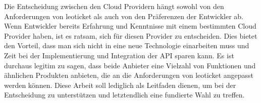 Die Entscheidung zwischen den Cloud Providern hängt sowohl von den Anforderungen von leoticket als auch von den Präferenzen der Entwickler ab. Wenn Entwickler bereits Erfahrung und Kenntnisse mit einem bestimmten Cloud Provider haben, ist es ratsam, sich für diesen Provider zu entscheiden. Dies bietet den Vorteil, dass man sich nicht in eine neue Technologie einarbeiten muss und Zeit bei der Implementierung und Integration der API sparen kann. Es ist durchaus legitim zu sagen, dass beide Anbieter eine Vielzahl von Funktionen und ähnlichen Produkten anbieten, die an die Anforderungen von leoticket angepasst werden können. Diese Arbeit soll lediglich als Leitfaden dienen, um bei der Entscheidung zu unterstützen und letztendlich eine fundierte Wahl zu treffen.